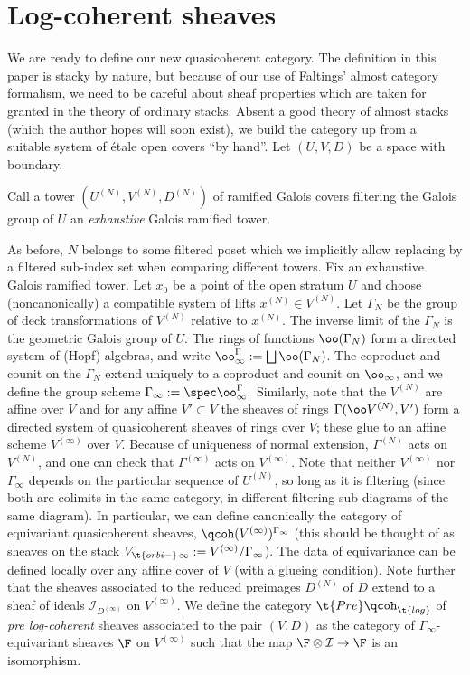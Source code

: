 \documentclass{article}
\newcommand{\I}{\mathcal{I}}
\begin{document}
\section{Log-coherent sheaves}
We are ready to define our new quasicoherent category. The definition in this paper is stacky by nature, but because of our use of Faltings' almost category formalism, we need to be careful about sheaf properties which are taken for granted in the theory of ordinary stacks. Absent a good theory of almost stacks (which the author hopes will soon exist), we build the category up from a suitable system of \'etale open covers ``by hand''.
Let $(U, V, D)$ be a space with boundary. 
\begin{defi} Call a tower $(U^{(N)}, V^{(N)}, D^{(N)})$ of ramified Galois covers filtering the Galois group of $U$ an \emph{exhaustive} Galois ramified tower. 
\end{defi}
As before, $N$ belongs to some filtered poset which we implicitly allow replacing by a filtered sub-index set when comparing different towers. Fix an exhaustive Galois ramified tower. Let $x_0$ be a point of the open stratum $U$ and choose (noncanonically) a compatible system of lifts $x^{(N)}\in V^{(N)}$. Let $\Gamma_N$ be the group of deck transformations of $V^{(N)}$ relative to $x^{(N)}$. The inverse limit of the $\Gamma_N$ is the geometric Galois group of $U$. The rings of functions $\oo(\Gamma_N)$ form a directed system of (Hopf) algebras, and write $\oo_\infty^\Gamma : = \bigsqcup \oo(\Gamma_N)$. The coproduct and counit on the $\Gamma_N$ extend uniquely to a coproduct and counit on $\oo_\infty$, and we define the group scheme $\Gamma_\infty := \spec\oo_\infty^\Gamma.$ Similarly, note that the $V^{(N)}$ are affine over $V$ and for any affine $V'\subset V$ the sheaves of rings $\Gamma(\oo V^{(N)}, V')$ form a directed system of quasicoherent sheaves of
rings over $V$; these glue to an affine scheme $V^{(\infty)}$ over $V$. Because of uniqueness of normal extension, $\Gamma^{(N)}$ acts on $V^{(N)}$, and one can check that $\Gamma^{(\infty)}$ acts on $V^{(\infty)}.$ Note that neither $V^{(\infty)}$ nor $\Gamma_\infty$ depends on the particular sequence of $U^{(N)}$, so long as it is filtering (since both are colimits in the same category, in different filtering sub-diagrams of the same diagram). In particular, we can define canonically the category of equivariant quasicoherent sheaves, $\qcoh(V^{(\infty)})^{\Gamma_\infty}$ (this should be thought of as sheaves on the stack $V_{\t{orbi-}\,\infty} : = V^{(\infty)}/\Gamma_\infty$). The data of equivariance can be defined locally over any affine cover of $V$ (with a glueing condition). Note further that the sheaves associated to the reduced preimages $D^{(N)}$ of $D$ extend to a sheaf of ideals $\I_{D^{(\infty)}}$ on $V^{(\infty)}$. We define the category $\t{Pre}\qcoh_{\t{log}}$ of \emph{pre log-coherent} sheaves associated to the pair $(V, D)$ as the category of $\Gamma_\infty$-equivariant sheaves $\F$ on $V^{(\infty)}$ such that the map $\F\otimes \I\to\F$ is an isomorphism. 
\end{document}
